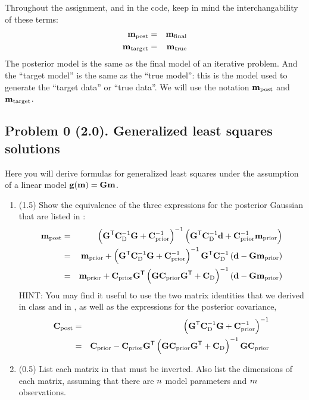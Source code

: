 \documentclass[11pt,titlepage,fleqn]{article}
\begin{document}
Throughout the assignment, and in the code, keep in mind the interchangability of these terms:
%
\begin{eqnarray*}
\mbox{${\bf m}$}_{\rm post} &=& \mbox{${\bf m}$}_{\rm final}
\\
\mbox{${\bf m}$}_{\rm target} &=& \mbox{${\bf m}$}_{\rm true}
\end{eqnarray*}
%
The posterior model is the same as the final model of an iterative problem. And the ``target model'' is the same as the ``true model'': this is the model used to generate the ``target data'' or ``true data''. We will use the notation $\mbox{${\bf m}$}_{\rm post}$ and $\mbox{${\bf m}$}_{\rm target}$.



\pagebreak
\subsection*{Problem 0 (2.0). Generalized least squares solutions}

Here you will derive formulas for generalized least squares under the assumption of a linear model $\mbox{${\bf g}$}(\mbox{${\bf m}$}) = \mbox{${\bf G}$}\mbox{${\bf m}$}$.
%
\begin{enumerate}
\item (1.5) Show the equivalence of the three expressions for the posterior Gaussian that are listed in \citet[][p.~66]{Tarantola2005}:
%
\begin{eqnarray}
\mpost &=& \left(\bG^{\tssT} \covdi \bG + \cpriori \right)^{-1}
\left( \bG^{\tssT} \covdi \bd + \cpriori\mprior \right)
\label{mpost1}
\\
&=& \mprior + \left(\bG^{\tssT} \covdi \bG + \cpriori \right)^{-1} \bG^{\tssT} \covdi \left( \bd - \bG \mprior\right)
\label{mpost2}
\\
&=& \mprior + \cprior \bG^{\tssT} \left( \bG \cprior \bG^{\tssT} + \Cd\right)^{-1} \left( \bd - \bG \mprior\right)
\label{mpost3}
\end{eqnarray}
%
HINT: You may find it useful to use the two matrix identities that we derived in class and in \citet[][Eq.~6.525]{Tarantola2005}, as well as the expressions for the posterior covariance,
%
\begin{eqnarray}
\cpost &=& \left(\bG^{\tssT} \covdi \bG + \cpriori \right)^{-1}
\label{cpost1}
\\
&=& \cprior - \cprior \bG^{\tssT} \left( \bG \cprior \bG^{\tssT} + \covd \right)^{-1} \bG \cprior
\label{cpost2}
\end{eqnarray}

\item (0.5) List each matrix in  that must be inverted. Also list the dimensions of each matrix, assuming that there are $n$ model parameters and $m$ observations.
\end{enumerate}
\end{document}
